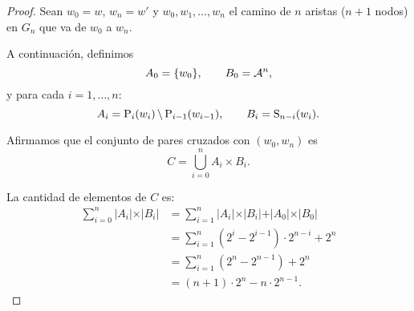 \documentclass[11pt]{article}
\begin{document}
\begin{proof}
	Sean $w_0 = w$, $w_n = w'$ y $w_0, w_1, \dots, w_n$ el camino de
	$n$ aristas ($n + 1$ nodos) en $G_n$ que va de $w_0$ a $w_n$.

	A continuación, definimos
	\[ A_0 = \lbrace w_0 \rbrace, \qquad
		B_0 = \mathcal{A}^n, \]
	y para cada $i = 1, \dots, n$:
	\[ A_i = \text{P}_{i}(w_i) \,\backslash\, \text{P}_{i - 1}(w_{i - 1}), \qquad
		B_i = \text{S}_{n - i}(w_i). \]

	Afirmamos que el conjunto de pares cruzados con $(w_0, w_n)$ es
	\[ C = \bigcup_{i = 0}^n A_i \times B_i. \]

	La cantidad de elementos de $C$ es:
	\begin{align*}
		\sum_{i = 0}^n \vert A_i \vert \times \vert B_i \vert
		 & = \sum_{i = 1}^n \vert A_i \vert \times \vert B_i \vert + \vert A_0
		\vert \times \vert B_0 \vert                                           \\
		 & = \sum_{i = 1}^n \left( 2^{i} - 2^{i - 1} \right) \cdot 2^{n - i} +
		2^n                                                                    \\
		 & = \sum_{i = 1}^n \left( 2^n - 2^{n - 1} \right) + 2^n               \\
		 & = (n + 1) \cdot 2^n - n \cdot 2^{n - 1}.
	\end{align*}
\end{proof}

{}

\end{document}

